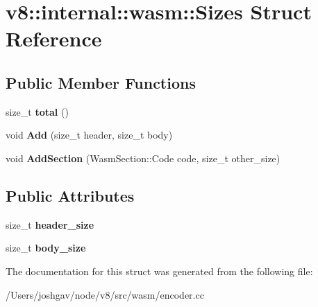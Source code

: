 \hypertarget{structv8_1_1internal_1_1wasm_1_1_sizes}{}\section{v8\+:\+:internal\+:\+:wasm\+:\+:Sizes Struct Reference}
\label{structv8_1_1internal_1_1wasm_1_1_sizes}
\subsection*{Public Member Functions}
\begin{DoxyCompactItemize}
\item 
size\+\_\+t {\bfseries total} ()\hypertarget{structv8_1_1internal_1_1wasm_1_1_sizes_aad87f00e941c18536d8b367f470a8e41}{}\label{structv8_1_1internal_1_1wasm_1_1_sizes_aad87f00e941c18536d8b367f470a8e41}

\item 
void {\bfseries Add} (size\+\_\+t header, size\+\_\+t body)\hypertarget{structv8_1_1internal_1_1wasm_1_1_sizes_ae5bf5d45da3bc8a4227aaa8c58d889a6}{}\label{structv8_1_1internal_1_1wasm_1_1_sizes_ae5bf5d45da3bc8a4227aaa8c58d889a6}

\item 
void {\bfseries Add\+Section} (Wasm\+Section\+::\+Code code, size\+\_\+t other\+\_\+size)\hypertarget{structv8_1_1internal_1_1wasm_1_1_sizes_acf62de25d933064a2fe6738fdfd8e2f8}{}\label{structv8_1_1internal_1_1wasm_1_1_sizes_acf62de25d933064a2fe6738fdfd8e2f8}

\end{DoxyCompactItemize}
\subsection*{Public Attributes}
\begin{DoxyCompactItemize}
\item 
size\+\_\+t {\bfseries header\+\_\+size}\hypertarget{structv8_1_1internal_1_1wasm_1_1_sizes_a708e0f721fdcc27d9408e5a525e1c529}{}\label{structv8_1_1internal_1_1wasm_1_1_sizes_a708e0f721fdcc27d9408e5a525e1c529}

\item 
size\+\_\+t {\bfseries body\+\_\+size}\hypertarget{structv8_1_1internal_1_1wasm_1_1_sizes_a5fd37907cf2aed42dd57d0e0a0fa04fe}{}\label{structv8_1_1internal_1_1wasm_1_1_sizes_a5fd37907cf2aed42dd57d0e0a0fa04fe}

\end{DoxyCompactItemize}


The documentation for this struct was generated from the following file\+:\begin{DoxyCompactItemize}
\item 
/\+Users/joshgav/node/v8/src/wasm/encoder.\+cc\end{DoxyCompactItemize}
